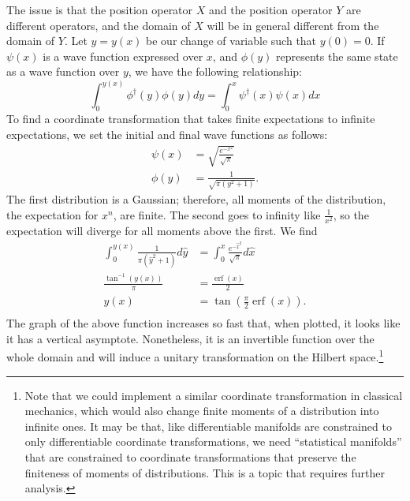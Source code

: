 \documentclass[10pt,twocolumn, nofootinbib]{revtex4-2}
\DeclareMathOperator{\erf}{erf}
\begin{document}
The issue is that the position operator $X$ and the position operator $Y$ are different operators, and the domain of $X$ will be in general different from the domain of $Y$. Let $y=y(x)$ be our change of variable such that $y(0) = 0$. If $\psi(x)$ is a wave function expressed over $x$, and $\phi(y)$ represents the same state as a wave function over $y$, we have the following relationship:
\begin{equation}
\int_{0}^{y(x)} \phi^\dagger(y) \phi(y) dy = \int_{0}^{x} \psi^\dagger(x) \psi(x) dx
\end{equation}
To find a coordinate transformation that takes finite expectations to infinite expectations, we set the initial and final wave functions as follows:
\begin{align}
\psi(x) &= \sqrt{\frac{e^{-x^2}}{\sqrt{\pi}}} \\
\phi(y) &= \frac{1}{\sqrt{\pi(y^2 + 1)}}.
\end{align}
The first distribution is a Gaussian; therefore, all moments of the distribution, the expectation for $x^n$, are finite. The second goes to infinity like $\frac{1}{x^2}$, so the expectation will diverge for all moments above the first. We find
\begin{equation}
\begin{aligned}
\int_{0}^{y(x)} \frac{1}{\pi(\hat{y}^2 + 1)} d\hat{y} &= \int_{0}^{x} \frac{e^{-\hat{x}^2}}{\sqrt{\pi}} d\hat{x} \\
\frac{\tan^{-1}(y(x))}{\pi} &= \frac{\erf(x)}{2} \\
y(x) &= \tan \left(\frac{\pi}{2}\erf(x)\right). \\
\end{aligned}
\end{equation}
The graph of the above function increases so fast that, when plotted, it looks like it has a vertical asymptote. Nonetheless, it is an invertible function over the whole domain and will induce a unitary transformation on the Hilbert space.\footnote{Note that we could implement a similar coordinate transformation in classical mechanics, which would also change finite moments of a distribution into infinite ones. It may be that, like differentiable manifolds are constrained to only differentiable coordinate transformations, we need ``statistical manifolds'' that are constrained to coordinate transformations that preserve the finiteness of moments of distributions. This is a topic that requires further analysis.}
\end{document}
